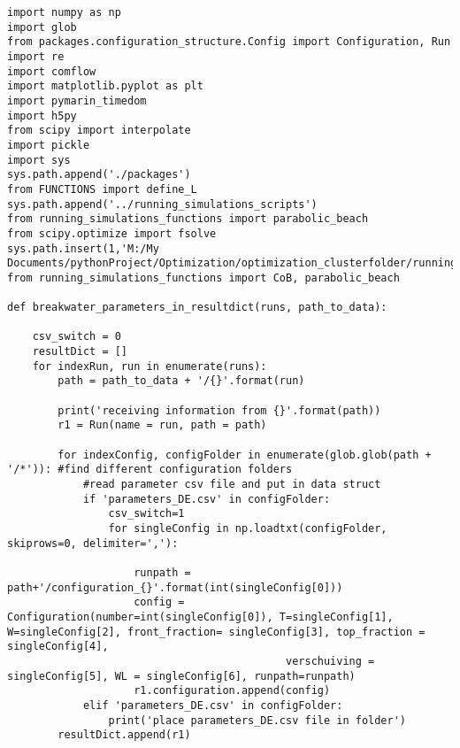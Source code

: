 \begin{mdframed}[backgroundcolor=light-gray, roundcorner=10pt,leftmargin=1, rightmargin=1, innerleftmargin=0, innertopmargin=7,innerbottommargin=0, outerlinewidth=1, linecolor=light-gray]
\begin{lstlisting}[linewidth=\columnwidth,caption=Functions used in post-processing ., label=script: post processing functions]
import numpy as np
import glob
from packages.configuration_structure.Config import Configuration, Run
import re
import comflow
import matplotlib.pyplot as plt
import pymarin_timedom
import h5py
from scipy import interpolate
import pickle
import sys
sys.path.append('./packages')
from FUNCTIONS import define_L
sys.path.append('../running_simulations_scripts')
from running_simulations_functions import parabolic_beach
from scipy.optimize import fsolve
sys.path.insert(1,'M:/My Documents/pythonProject/Optimization/optimization_clusterfolder/running_simulations_scripts')
from running_simulations_functions import CoB, parabolic_beach

def breakwater_parameters_in_resultdict(runs, path_to_data):

    csv_switch = 0
    resultDict = []
    for indexRun, run in enumerate(runs):
        path = path_to_data + '/{}'.format(run)

        print('receiving information from {}'.format(path))
        r1 = Run(name = run, path = path)

        for indexConfig, configFolder in enumerate(glob.glob(path + '/*')): #find different configuration folders
            #read parameter csv file and put in data struct
            if 'parameters_DE.csv' in configFolder:
                csv_switch=1
                for singleConfig in np.loadtxt(configFolder, skiprows=0, delimiter=','):

                    runpath = path+'/configuration_{}'.format(int(singleConfig[0]))
                    config = Configuration(number=int(singleConfig[0]), T=singleConfig[1], W=singleConfig[2], front_fraction= singleConfig[3], top_fraction = singleConfig[4],
                                            verschuiving = singleConfig[5], WL = singleConfig[6], runpath=runpath)
                    r1.configuration.append(config)
            elif 'parameters_DE.csv' in configFolder:
                print('place parameters_DE.csv file in folder')
        resultDict.append(r1)



\end{lstlisting}
\end{mdframed}
